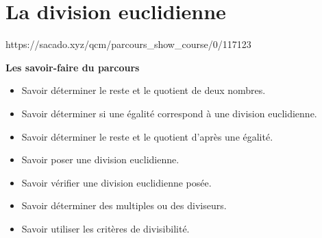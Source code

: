 \chapter{La division euclidienne}
{https://sacado.xyz/qcm/parcours_show_course/0/117123}
{


\begin{CpsCol}
\textbf{ Les savoir-faire du parcours }
 \begin{itemize}
 \item Savoir déterminer le reste et le quotient de deux nombres.
 \item Savoir déterminer si une égalité correspond à une division euclidienne.
 \item Savoir déterminer le reste et le quotient d'après une égalité.
 \item Savoir poser une division euclidienne.
 \item Savoir vérifier une division euclidienne posée.
 \item Savoir déterminer des multiples ou des diviseurs.
 \item Savoir utiliser les critères de divisibilité.
 \end{itemize}
\end{CpsCol}

}




